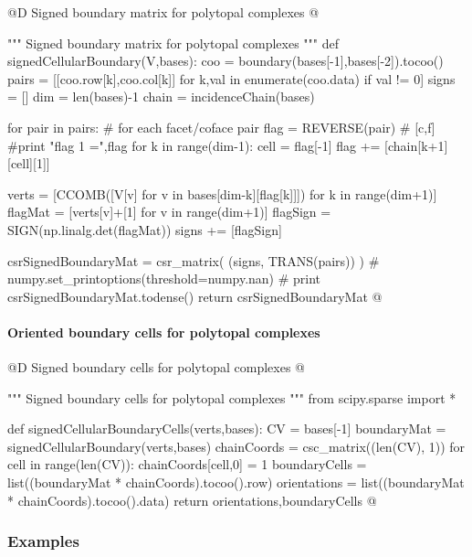 \documentclass[11pt,oneside]{article}    %
\begin{document}
@D Signed boundary matrix for polytopal complexes
@{""" Signed boundary matrix for polytopal complexes """
def signedCellularBoundary(V,bases):
    coo = boundary(bases[-1],bases[-2]).tocoo()
    pairs = [[coo.row[k],coo.col[k]] for k,val in enumerate(coo.data) if val != 0]
    signs = []
    dim = len(bases)-1
    chain = incidenceChain(bases)
    
    for pair in pairs:        # for each facet/coface pair
        flag = REVERSE(pair) #  [c,f]
        #print "flag 1 =",flag
        for k in range(dim-1):
            cell = flag[-1]
            flag += [chain[k+1][cell][1]]
        
        verts = [CCOMB([V[v] for v in bases[dim-k][flag[k]]]) for k in range(dim+1)]
        flagMat = [verts[v]+[1] for v in range(dim+1)]
        flagSign = SIGN(np.linalg.det(flagMat))
        signs += [flagSign]
    
    csrSignedBoundaryMat = csr_matrix( (signs, TRANS(pairs)) )
    # numpy.set_printoptions(threshold=numpy.nan)
    # print csrSignedBoundaryMat.todense()
    return csrSignedBoundaryMat
@}

\paragraph{Oriented boundary cells for polytopal complexes}

@D Signed boundary cells for polytopal complexes
@{""" Signed boundary cells for polytopal complexes """
from scipy.sparse import *

def signedCellularBoundaryCells(verts,bases):
    CV = bases[-1]
    boundaryMat = signedCellularBoundary(verts,bases)
    chainCoords = csc_matrix((len(CV), 1))
    for cell in range(len(CV)): chainCoords[cell,0] = 1
    boundaryCells = list((boundaryMat * chainCoords).tocoo().row)
    orientations = list((boundaryMat * chainCoords).tocoo().data)
    return orientations,boundaryCells
@}

\subsubsection{Examples}
\end{document}

